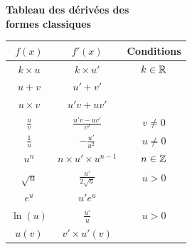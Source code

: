 \documentclass[oneside,12pt]{book}          %
\begin{document}
\begin{minipage}[t]{0.54\textwidth}
\center
\textbf{\large Tableau des dérivées des\\formes classiques}\\[10pt]
\renewcommand{\arraystretch}{1.7}

\begin{tabular}{ | c | c | c |}
   \hline
   
 $f(x)$ & $f'(x)$ & Conditions \\ \hline \hline
 $k\times u$ & $k\times u'$ & $k\in{\mathbb R}$ \\ \hline
 $u+v$ & $u'+v'$ & \\ \hline
 $u\times v$ & $u'v+uv'$& \\ \hline
 $\frac{u}{v}$ & $\frac{u'v-uv'}{v^{2}}$& $v\neq 0$\\ \hline
 $\frac{1}{u}$ & $-\frac{u'}{u^2}$ & $u\neq0$ \\ \hline
 $u^{n}$ & $n\times u'\times  u^{n-1}$ & $n\in {\mathbb Z}$\\ \hline
 $\sqrt{u}$ & $\frac{u'}{2\sqrt{u}}$ & $u > 0$ \\ \hline
 $e^{u}$ & $u'e^{u}$ &  \\ \hline
 $\ln{(u)}$ & $\frac{u'}{u}$ & $u>0$\\ \hline
 $u(v)$ & $v'\times u'(v)$ & \\ \hline
   
 \end{tabular}


\end{minipage}

\vspace{1cm}
\end{document}
